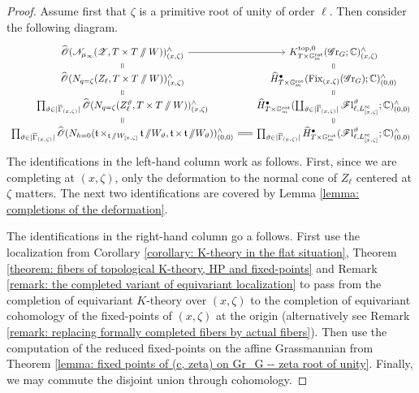 \begin{proof}
\bigskip
Assume first that $\zeta$ is a primitive root of unity of order $\ell$. Then consider the following diagram.
\begin{equation*}
    \begin{tikzcd}[row sep = 5, column sep =15]
      \widehat{\O}({\eN}_{\mu_{\infty}}(\eZ, T \times T \sslash W))^{\wedge}_{(x, \zeta)} \arrow[d, equal] \arrow[r] & K^{\top, 0}_{T \times \Gm^{\rot}}(\Gr_{G}; \C)^{\wedge}_{(x, \zeta)} \arrow[d, equal] \\
      \widehat{\O}({N}_{q=\zeta}(Z_{\ell}, T \times T \sslash W))^{\wedge}_{(x, \zeta)} \arrow[d, equal]  & \widehat{H}^{\bullet}_{T \times \Gm^{\rot}}(\Fix_{(x, \zeta)}(\Gr_G); \C)^{\wedge}_{(0, 0)} \arrow[d, equal] \\
      \prod_{\vartheta \in |\overline{\Gamma}_{(x, \zeta)}|} \widehat{\O}(N_{q=\zeta}({Z_{\ell}^{\vartheta}}, T \times T\sslash W))^{\wedge}_{(x, \zeta)} \arrow[d, equal] & \widehat{H}^{\bullet}_{T \times \Gm^{\rot}}(\coprod_{\vartheta \in |\overline{\Gamma}_{(x, \zeta)}|} \Fl^{\vartheta}_{\ell, L^{\sc}_{[x, \zeta]}}; \C)^{\wedge}_{(0, 0)} \arrow[d, equal] \\
      \prod_{\vartheta \in |\overline{\Gamma}_{(x, \zeta)}|} \widehat{\O}(N_{h=0}(\t \times_{\t \sslash W_{[x, \zeta]}} \t \sslash W_{\vartheta},  \t \times \t \sslash W_{\vartheta} ))^{\wedge}_{(0,0)} \arrow[r, equal] & \prod_{\vartheta \in |\overline{\Gamma}_{(x, \zeta)}|} \widehat{H}^{\bullet}_{T \times \Gm^{\rot}}(\Fl^{\vartheta}_{\ell, L^{\sc}_{[x, \zeta]}}; \C)^{\wedge}_{(0, 0)}
    \end{tikzcd}
\end{equation*}
The identifications in the left-hand column work as follows. First, since we are completing at $(x, \zeta)$, only the deformation to the normal cone of $Z_{\ell}$ centered at $\zeta$ matters. The next two identifications are covered by Lemma \ref{lemma: completions of the deformation}.

The identifications in the right-hand column go a follows. First use the localization from Corollary \ref{corollary: K-theory in the flat situation}, Theorem \ref{theorem: fibers of topological K-theory, HP and fixed-points} and Remark \ref{remark: the completed variant of equivariant localization} to pass from the completion of equivariant $K$-theory over $(x, \zeta)$ to the completion of equivariant cohomology of the fixed-points of $(x, \zeta)$ at the origin (alternatively see Remark \ref{remark: replacing formally completed fibers by actual fibers}). Then use the computation of the reduced fixed-points on the affine Grassmannian from Theorem \ref{lemma: fixed points of (c, zeta) on Gr_G -- zeta root of unity}. Finally, we may commute the disjoint union through cohomology.


\end{proof}
